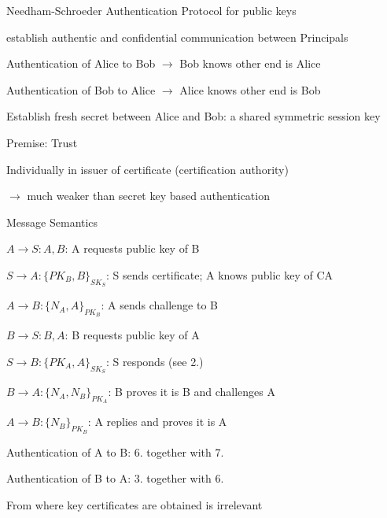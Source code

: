 \documentclass[a4paper]{article}
\begin{document}
\begin{multicols}{3}
    Needham-Schroeder Authentication Protocol for public keys
    \begin{itemize*}
        \item establish authentic and confidential communication between Principals
        \begin{enumerate*}
            \item Authentication of Alice to Bob $\rightarrow$ Bob knows other end is Alice
            \item Authentication of Bob to Alice $\rightarrow$ Alice knows other end is Bob
            \item Establish fresh secret between Alice and Bob: a shared symmetric session key
        \end{enumerate*}
        \item Premise: Trust
        \begin{itemize*}
            \item Individually in issuer of certificate (certification authority)
            \item[$\rightarrow$] much weaker than secret key based authentication
        \end{itemize*}
        \item Message Semantics
        \begin{enumerate*}
            \item $A\rightarrow S:A,B$: A requests public key of B
            \item $S\rightarrow A:\{PK_B,B\}_{SK_S}$: S sends certificate; A knows public key of CA
            \item $A\rightarrow B:\{N_A,A\}_{PK_B}$: A sends challenge to B
            \item $B\rightarrow S:B,A$: B requests public key of A
            \item $S\rightarrow B:\{PK_A,A\}_{SK_S}$: S responds (see 2.)
            \item $B\rightarrow A:\{N_A, N_B\}_{PK_A}$: B proves it is B and challenges A
            \item $A\rightarrow B:\{N_B\}_{PK_B}$: A replies and proves it is A
        \end{enumerate*}
        \begin{itemize*}
            \item Authentication of A to B: 6. together with 7.
            \item Authentication of B to A: 3. together with 6.
            \item From where key certificates are obtained is irrelevant
        \end{itemize*}
    \end{itemize*}


\end{multicols}
\end{document}
